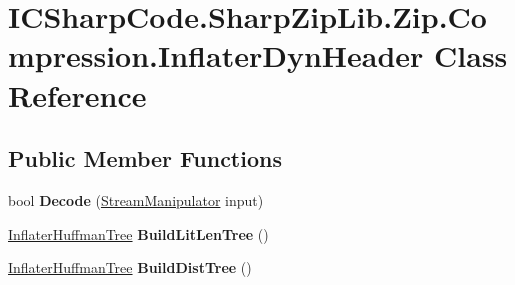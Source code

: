 \hypertarget{class_i_c_sharp_code_1_1_sharp_zip_lib_1_1_zip_1_1_compression_1_1_inflater_dyn_header}{}\section{I\+C\+Sharp\+Code.\+Sharp\+Zip\+Lib.\+Zip.\+Compression.\+Inflater\+Dyn\+Header Class Reference}
\label{class_i_c_sharp_code_1_1_sharp_zip_lib_1_1_zip_1_1_compression_1_1_inflater_dyn_header}
\subsection*{Public Member Functions}
\begin{DoxyCompactItemize}
\item 
\mbox{\label{class_i_c_sharp_code_1_1_sharp_zip_lib_1_1_zip_1_1_compression_1_1_inflater_dyn_header_ab0126f86880709b101bbeaf4e0916a3c}} 
bool {\bfseries Decode} (\hyperlink{class_i_c_sharp_code_1_1_sharp_zip_lib_1_1_zip_1_1_compression_1_1_streams_1_1_stream_manipulator}{Stream\+Manipulator} input)
\item 
\mbox{\label{class_i_c_sharp_code_1_1_sharp_zip_lib_1_1_zip_1_1_compression_1_1_inflater_dyn_header_a5ab9038d6db0dbffe4e5fd64815b5965}} 
\hyperlink{class_i_c_sharp_code_1_1_sharp_zip_lib_1_1_zip_1_1_compression_1_1_inflater_huffman_tree}{Inflater\+Huffman\+Tree} {\bfseries Build\+Lit\+Len\+Tree} ()
\item 
\mbox{\label{class_i_c_sharp_code_1_1_sharp_zip_lib_1_1_zip_1_1_compression_1_1_inflater_dyn_header_aa4703f6b1fe270e9368ec2ce43ce8907}} 
\hyperlink{class_i_c_sharp_code_1_1_sharp_zip_lib_1_1_zip_1_1_compression_1_1_inflater_huffman_tree}{Inflater\+Huffman\+Tree} {\bfseries Build\+Dist\+Tree} ()
\item 
\mbox{\label{class_i_c_sharp_code_1_1_sharp_zip_lib_1_1_zip_1_1_compression_1_1_inflater_dyn_header_ab0126f86880709b101bbeaf4e0916a3c}} 

\end{DoxyCompactItemize}
